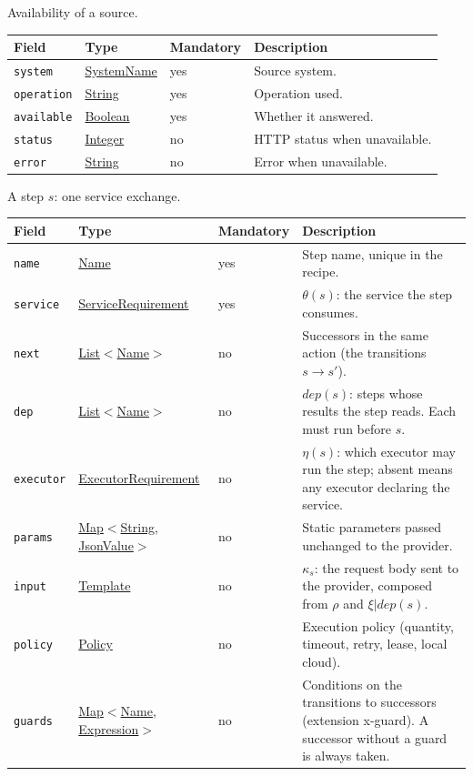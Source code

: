 \documentclass[a4paper]{arrowhead}
\newcommand{\mref}[1]{{\textcolor{ArrowheadPurple}{\hyperref[sec:model:#1]{#1}}}}
\newcommand{\pref}[1]{{\textcolor{ArrowheadGrey}{\hyperref[sec:model:primitives:#1]{#1}}}}
\begin{document}
Availability of a source.

{\small
\begin{longtable}{|p{3.7cm}|p{4.2cm}|p{1.6cm}|p{6.3cm}|}

\hline
\rowcolor{gray!33} Field & Type & Mandatory & Description \\ \hline
\endhead
\texttt{system} & \pref{SystemName} & yes & Source system. \\ \hline
\texttt{operation} & \pref{String} & yes & Operation used. \\ \hline
\texttt{available} & \pref{Boolean} & yes & Whether it answered. \\ \hline
\texttt{status} & \pref{Integer} & no & HTTP status when unavailable. \\ \hline
\texttt{error} & \pref{String} & no & Error when unavailable. \\ \hline
\end{longtable}
}

A step $s$: one service exchange.

{\small
\begin{longtable}{|p{3.7cm}|p{4.2cm}|p{1.6cm}|p{6.3cm}|}

\hline
\rowcolor{gray!33} Field & Type & Mandatory & Description \\ \hline
\endhead
\texttt{name} & \pref{Name} & yes & Step name, unique in the recipe. \\ \hline
\texttt{service} & \mref{ServiceRequirement} & yes & $\theta(s)$: the service the step consumes. \\ \hline
\texttt{next} & \pref{List}$<$\pref{Name}$>$ & no & Successors in the same action (the transitions $s \rightarrow s'$). \\ \hline
\texttt{dep} & \pref{List}$<$\pref{Name}$>$ & no & $dep(s)$: steps whose results the step reads. Each must run before $s$. \\ \hline
\texttt{executor} & \mref{ExecutorRequirement} & no & $\eta(s)$: which executor may run the step; absent means any executor declaring the service. \\ \hline
\texttt{params} & \pref{Map}$<$\pref{String}, \pref{JsonValue}$>$ & no & Static parameters passed unchanged to the provider. \\ \hline
\texttt{input} & \pref{Template} & no & $\kappa_s$: the request body sent to the provider, composed from $\rho$ and $\xi|dep(s)$. \\ \hline
\texttt{policy} & \mref{Policy} & no & Execution policy (quantity, timeout, retry, lease, local cloud). \\ \hline
\texttt{guards} & \pref{Map}$<$\pref{Name}, \pref{Expression}$>$ & no & Conditions on the transitions to successors (extension x-guard). A successor without a guard is always taken. \\ \hline
\end{longtable}
}
\end{document}
